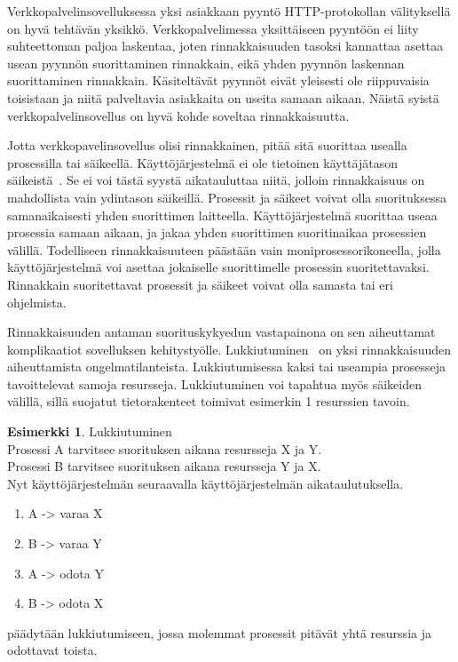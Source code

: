 \documentclass[finnish]{tktltiki2}%
\theoremstyle{definition}
\newtheorem{esim}[lau]{Esimerkki}
\theoremstyle{remark}
\begin{document}
Verkkopalvelinsovelluksessa yksi asiakkaan pyyntö HTTP-protokollan välityksellä
on hyvä tehtävän yksikkö. Verkkopalvelimessa yksittäiseen
pyyntöön ei liity suhteettoman paljoa laskentaa, joten
rinnakkaisuuden tasoksi kannattaa asettaa usean pyynnön
suorittaminen rinnakkain, eikä yhden pyynnön laskennan
suorittaminen rinnakkain.
Käsiteltävät pyynnöt eivät yleisesti ole riippuvaisia
toisistaan ja niitä palveltavia asiakkaita on useita
samaan aikaan.
Näistä syistä verkkopalvelinsovellus on hyvä kohde soveltaa rinnakkaisuutta.

Jotta verkkopavelinsovellus olisi rinnakkainen, pitää sitä
suorittaa usealla prosessilla tai säikeellä.
Käyttöjärjestelmä ei ole tietoinen käyttäjätason säikeistä~\cite{stallings_operating_2018}.
Se ei voi tästä syystä aikatauluttaa niitä,
jolloin rinnakkaisuus on mahdollista
vain ydintason säikeillä.
Prosessit ja säikeet voivat olla suorituksessa samanaikaisesti
yhden suorittimen laitteella. Käyttöjärjestelmä suorittaa useaa prosessia
samaan aikaan, ja jakaa yhden suorittimen suoritinaikaa prosessien välillä.
Todelliseen rinnakkaisuuteen päästään vain moniprosessorikoneella, jolla
käyttöjärjestelmä voi asettaa jokaiselle suorittimelle prosessin suoritettavaksi.
Rinnakkain suoritettavat prosessit ja säikeet voivat olla samasta tai
eri ohjelmista.

Rinnakkaisuuden antaman suorituskykyedun vastapainona
on sen aiheuttamat komplikaatiot sovelluksen kehitystyölle.
Lukkiutuminen~\cite{stallings_operating_2018}
on yksi rinnakkaisuuden aiheuttamista ongelmatilanteista.
Lukkiutumisessa kaksi tai useampia prosesseja tavoittelevat samoja resursseja.
Lukkiutuminen voi tapahtua myös säikeiden välillä, sillä
suojatut tietorakenteet toimivat esimerkin 1 resurssien tavoin.

\begin{center}
  \begin{esim}
    Lukkiutuminen \\
    Prosessi A tarvitsee suorituksen aikana resursseja X ja Y. \\
    Prosessi B tarvitsee suorituksen aikana resursseja Y ja X. \\
    Nyt käyttöjärjestelmän seuraavalla käyttöjärjestelmän aikataulutuksella.
    \begin{enumerate}
      \item A -> varaa X
      \item B -> varaa Y
      \item A -> odota Y
      \item B -> odota X
    \end{enumerate}
    päädytään lukkiutumiseen, jossa molemmat prosessit
    pitävät yhtä resurssia ja odottavat toista.
  \end{esim}
\end{center}
\end{document}

